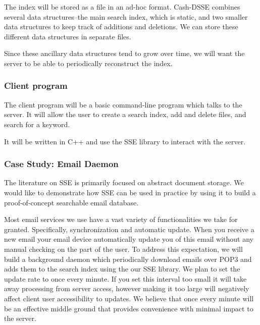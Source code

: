 The index will be stored as a file in an ad-hoc format.
Cash-DSSE combines several data structures--the main search index, which is static, and two smaller data structures to keep track of additions and deletions.
We can store these different data structures in separate files. %

Since these ancillary data structures tend to grow over time, we will want the server to be able to periodically reconstruct the index. %

\subsubsection{ Client program }

The client program will be a basic command-line program which talks to the server.
It will allow the user to create a search index, add and delete files, and search for a keyword.

It will be written in C++ and use the SSE library to interact with the server.

\subsubsection{ Case Study: Email Daemon }
\label{subsec:email}


The literature on SSE is primarily focused on abstract document storage. We would like to demonstrate how SSE can be used in practice by using it to build a proof-of-concept searchable email database.

Most email services we use have a vast variety of functionalities we take for granted.
Specifically, synchronization and automatic update.
When you receive a new email your email device automatically update you of this email without any manual checking on the part of the user. 
To address this expectation, we will build a background daemon which periodically download emails over POP3 and adds them to the search index using the our SSE library.
We plan to set the update rate to once every minute.
If you set this interval too small it will take away processing from server access, however making it too large will negatively affect client user accessibility to updates.
We believe that once every minute will be an effective middle ground that provides convenience with minimal impact to the server.

